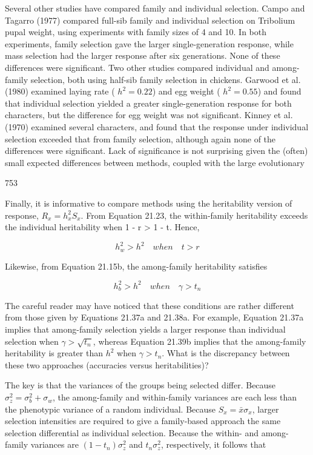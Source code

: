 \documentclass{article}
\begin{document}
Several other studies have compared family and individual selection. Campo and Tagarro (1977) compared full-sib family and individual selection on Tribolium pupal weight, using experiments with family sizes of 4 and 10. In both experiments, family selection gave the larger single-generation response, while mass selection had the larger response after six generations. None of these differences were significant. Two other studies compared individual and among-family selection, both using half-sib family selection in chickens. Garwood et al. (1980) examined laying rate ( $ h^{2}=0.22 $) and egg weight ( $ h^{2}=0.55 $) and found that individual selection yielded a greater single-generation response for both characters, but the difference for egg weight was not significant. Kinney et al. (1970) examined several characters, and found that the response under individual selection exceeded that from family selection, although again none of the differences were significant. Lack of significance is not surprising given the (often) small expected differences between methods, coupled with the large evolutionary

753

Finally, it is informative to compare methods using the heritability version of response,  $ R_{x} = h_{x}^{2} S_{x} $. From Equation 21.23, the within-family heritability exceeds the individual heritability when 1 - r > 1 - t. Hence,

\begin{equation}
h_{w}^{2}>h^{2}\quad when\quad t>r
\tag{21.39a}
\label{eq:21_39a}
\end{equation}

Likewise, from Equation 21.15b, the among-family heritability satisfies

\begin{equation}
h_{b}^{2}>h^{2}\quad when\quad\gamma>t_{n}
\tag{21.39b}
\label{eq:21_39b}
\end{equation}

The careful reader may have noticed that these conditions are rather different from those given by Equations 21.37a and 21.38a. For example, Equation 21.37a implies that among-family selection yields a larger response than individual selection when  $ \gamma > \sqrt{t_n} $, whereas Equation 21.39b implies that the among-family heritability is greater than  $ h^2 $ when  $ \gamma > t_n $. What is the discrepancy between these two approaches (accuracies versus heritabilities)?

The key is that the variances of the groups being selected differ. Because  $ \sigma_z^2 = \sigma_b^2 + \sigma_{w} $, the among-family and within-family variances are each less than the phenotypic variance of a random individual. Because  $ S_x = \bar{x}\sigma_x $, larger selection intensities are required to give a family-based approach the same selection differential as individual selection. Because the within- and among-family variances are  $ (1 - t_n)\sigma_z^2 $ and  $ t_n\sigma_z^2 $, respectively, it follows that
\end{document}
